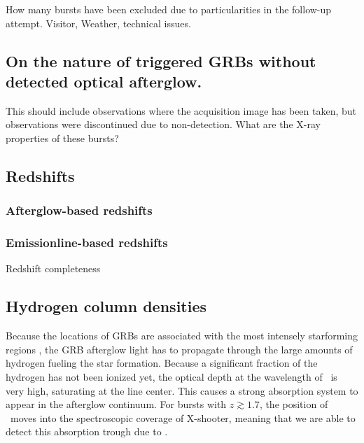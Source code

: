 \documentclass{aa}    %
\begin{document}
How many bursts have been excluded due to particularities in the follow-up attempt. Visitor, Weather, technical issues.  	

\subsection{On the nature of triggered GRBs without detected optical afterglow.}

This should include observations where the acquisition image has been taken, but observations were discontinued due to non-detection. What are the X-ray properties of these bursts?

\subsection{Redshifts}

\subsubsection{Afterglow-based redshifts}

\subsubsection{Emissionline-based redshifts}	

Redshift completeness


\subsection{Hydrogen column densities}

Because the locations of GRBs are associated with the most intensely starforming
regions \citep{Hogg1999, Bloom2002, Fruchter2006}, the GRB afterglow light has
to propagate through the large amounts of hydrogen fueling the star formation.
Because a significant fraction of the hydrogen has not been ionized yet, the
optical depth at the wavelength of \lya~is very high, saturating at the line
center. This causes a strong absorption system to appear in the afterglow
continuum. For bursts with $z \gtrsim 1.7$, the position of \lya~moves into the
spectroscopic coverage of X-shooter, meaning that we are able to detect this
absorption trough due to \lya.
\end{document}
